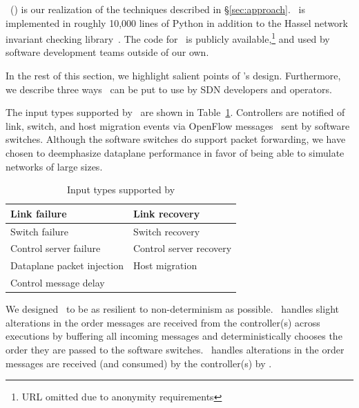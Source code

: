 \projectname~(\projectmeaning) is our realization of the techniques described in
\S\ref{sec:approach}. \projectname~is implemented in roughly 10,000 lines of Python in
addition to the Hassel network invariant checking library~\cite{hsa}. The code
for \projectname~is publicly available,\footnote{URL omitted due to anonymity requirements}
and used by  software development teams outside of our own.

In the rest of this section, we highlight salient points of \projectname's
design. Furthermore, we describe three ways \projectname~can be put to use
by SDN developers and operators.

The input types supported by \projectname~are shown in Table~\ref{tab:inputs}.
Controllers are notified of link, switch, and host migration events
via OpenFlow messages~\cite{openflow} sent by software switches.
Although the software switches do support packet forwarding, we
have chosen to deemphasize dataplane performance in favor of
being able to simulate networks of large sizes. %

\begin{table}
\centering
\begin{tabular}{|l|l|}
\hline
Link failure & Link recovery \\
\hline
Switch failure & Switch recovery \\
\hline
Control server failure & Control server recovery \\
\hline
Dataplane packet injection & Host migration \\
\hline
Control message delay & \\
\hline
\end{tabular}
\caption{Input types supported by \projectname}
\label{tab:inputs}
\end{table}

We designed \projectname~to be as resilient to non-determinism as possible.
\projectname~handles slight alterations in the order messages are received from the
controller(s) across executions by buffering all incoming messages and
deterministically chooses the order they are
passed to the software switches. \projectname~handles alterations in the order messages
are received (and consumed) by the controller(s) by .

